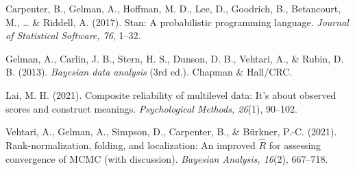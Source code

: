 \documentclass[
  english,
  man,floatsintext]{apa6}
\begin{document}
Carpenter, B., Gelman, A., Hoffman, M. D., Lee, D., Goodrich, B., Betancourt, M., \ldots{} \& Riddell, A. (2017). Stan: A probabilistic programming language. \emph{Journal of Statistical Software, 76}, 1--32.

Gelman, A., Carlin, J. B., Stern, H. S., Dunson, D. B., Vehtari, A., \& Rubin, D. B. (2013). \emph{Bayesian data analysis} (3rd ed.). Chapman \& Hall/CRC.

Lai, M. H. (2021). Composite reliability of multilevel data: It's about observed scores and construct meanings. \emph{Psychological Methods, 26}(1), 90--102.

Vehtari, A., Gelman, A., Simpson, D., Carpenter, B., \& Bürkner, P.-C. (2021). Rank-normalization, folding, and localization: An improved \(\hat{R}\) for assessing convergence of MCMC (with discussion). \emph{Bayesian Analysis, 16}(2), 667--718.
\end{document}
